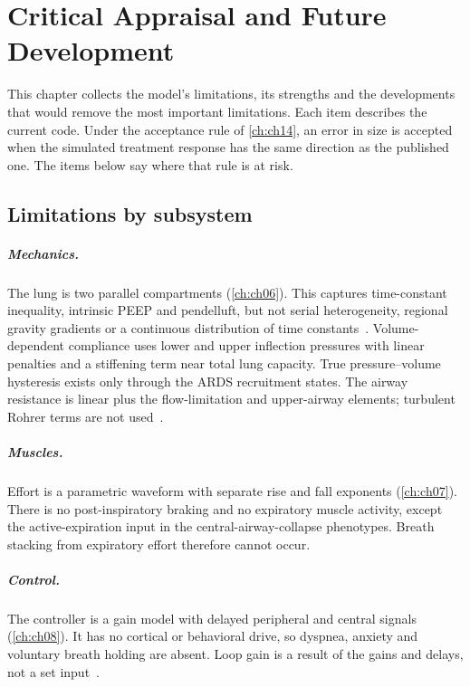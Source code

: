 \chapter{Critical Appraisal and Future Development}
\label{ch:appraisal}

This chapter collects the model's limitations, its strengths and the developments that would remove the most important limitations. Each item describes the current code. Under the acceptance rule of \cref{ch:ch14}, an error in size is accepted when the simulated treatment response has the same direction as the published one. The items below say where that rule is at risk.

\section{Limitations by subsystem}
\label{sec:app-lim}

\paragraph{Mechanics.} The lung is two parallel compartments (\cref{ch:ch06}). This captures time-constant inequality, intrinsic PEEP and pendelluft, but not serial heterogeneity, regional gravity gradients or a continuous distribution of time constants~\citep{otis1956,bates2009a}. Volume-dependent compliance uses lower and upper inflection pressures with linear penalties and a stiffening term near total lung capacity. True pressure--volume hysteresis exists only through the ARDS recruitment states. The airway resistance is linear plus the flow-limitation and upper-airway elements; turbulent Rohrer terms are not used~\citep{rohrer1915}.

\paragraph{Muscles.} Effort is a parametric waveform with separate rise and fall exponents (\cref{ch:ch07}). There is no post-inspiratory braking and no expiratory muscle activity, except the active-expiration input in the central-airway-collapse phenotypes. Breath stacking from expiratory effort therefore cannot occur.

\paragraph{Control.} The controller is a gain model with delayed peripheral and central signals (\cref{ch:ch08}). It has no cortical or behavioral drive, so dyspnea, anxiety and voluntary breath holding are absent. Loop gain is a result of the gains and delays, not a set input~\citep{khoo1982}.


